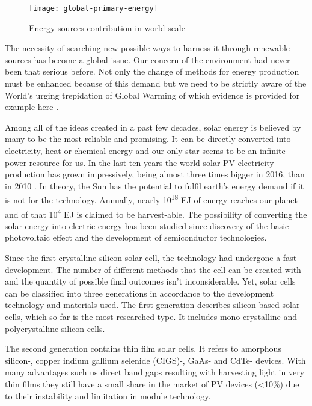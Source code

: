 \begin{figure}[H]
\centering
\texttt{[image: global-primary-energy]}
\caption{Energy sources contribution in world scale
\cite{2019}}
\label{fig:ensour}
\end{figure}

\noindent The necessity of searching new possible ways to harness it through renewable sources has become a global issue. Our concern of the environment had never been that serious before. Not only the change of methods for energy production must be enhanced because of this demand but we need to be strictly aware of the World's urging trepidation of Global Warming of which evidence is provided for example here \cite{Nasa2019}.

\noindent Among all of the ideas created in a past few decades, solar energy is
believed by many to be the most reliable and promising. It can be
directly converted into electricity, heat or chemical energy and our
only star seems to be an infinite power resource for us. In the last ten
years the world solar PV electricity production has grown impressively,
being almost three times bigger in 2016, than in 2010 \cite{2018}. In theory,
the Sun has the potential to fulfil earth's energy demand if it is not
for the technology. Annually, nearly 10\textsuperscript{18} EJ of energy
reaches our planet and of that 10\textsuperscript{4} EJ is claimed to be
harvest-able. The possibility of converting the solar energy into
electric energy has been studied since discovery of the basic
photovoltaic effect and the development of semiconductor technologies.

\noindent Since the first crystalline silicon solar cell, the technology had undergone a fast development. The number of different methods that the cell can be created with and the quantity of possible final outcomes isn't inconsiderable. Yet, solar cells can be classified into three generations in accordance to the development technology and materials used. \cite{HuashangRao2018} The first generation describes silicon based solar cells, which so far is the most researched type. It includes mono-crystalline and polycrystalline silicon cells.

\noindent The second generation contains thin film solar cells. It refers to amorphous silicon-, copper indium gallium selenide (CIGS)-, GaAs- and CdTe- devices. With many advantages such us direct band gaps resulting with harvesting light in very thin films they still have a small share in the market of PV devices (<10\%) due to their instability and limitation in module technology. \cite{HuashangRao2018}

